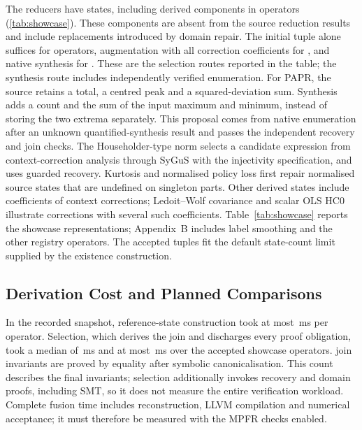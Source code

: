 The \showChains reducers have \showStates states, including \showDerived derived components in \showDerivedOps operators (\cref{tab:showcase}).
These components are absent from the source reduction results and include replacements introduced by domain repair.
The initial tuple alone suffices for \showOriginalOps operators, augmentation with all correction coefficients for \showRebaseOps, and native synthesis for \showSygusOps.
These are the selection routes reported in the table; the synthesis route includes independently verified enumeration.
For PAPR, the source retains a total, a centred peak and a squared-deviation sum.
Synthesis adds a count and the sum of the input maximum and minimum, instead of storing the two extrema separately.
This proposal comes from native enumeration after an unknown quantified-synthesis result and passes the independent recovery and join checks.
The Householder-type norm selects a candidate expression from context-correction analysis through SyGuS with the injectivity specification, and uses guarded recovery.
Kurtosis and normalised policy loss first repair normalised source states that are undefined on singleton parts.
Other derived states include coefficients of context corrections; Ledoit--Wolf covariance and scalar OLS HC0 illustrate corrections with several such coefficients.
Table~\ref{tab:showcase} reports the showcase representations; Appendix~B includes label smoothing and the other registry operators.
The accepted tuples fit the default state-count limit supplied by the existence construction.

\subsection{Derivation Cost and Planned Comparisons}
\label{sec:eval-cost}

In the recorded snapshot, reference-state construction took at most \showJudgeMaxMs{}\,ms per operator.
Selection, which derives the join and discharges every proof obligation, took a median of \showSelectMedianMs{}\,ms and at most \showSelectMaxMs{}\,ms over the accepted showcase operators.
\showInvCanonical join invariants are proved by equality after symbolic canonicalisation.
This count describes the final invariants; selection additionally invokes recovery and domain proofs, including SMT, so it does not measure the entire verification workload.
Complete fusion time includes reconstruction, LLVM compilation and numerical acceptance; it must therefore be measured with the MPFR checks enabled.

